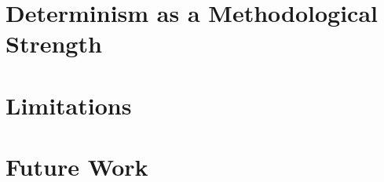 \section{Determinism as a Methodological Strength}
\label{sec:discussion-determinism}


\section{Limitations}
\label{sec:discussion-limitations}

%
%
%

\section{Future Work}
\label{sec:discussion-future}

